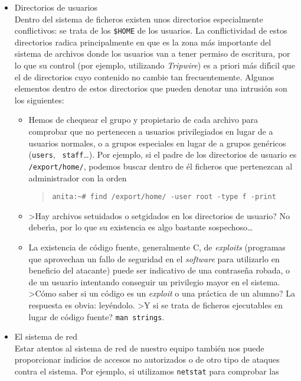 \begin{itemize}
{\it Tripwire}, comentado en este mismo punto.
\item Directorios de usuarios\label{userdir}\\
Dentro del sistema de ficheros existen unos directorios especialmente 
conflictivos: se trata de los {\tt \$HOME} de los usuarios. La conflictividad
de estos directorios radica principalmente en que es la zona m\'as importante 
del sistema de archivos donde los usuarios van a tener permiso de escritura,
por lo que su control (por ejemplo, utilizando {\it Tripwire}) es a priori 
m\'as dif\'{\i}cil que el de directorios cuyo contenido no cambie tan 
frecuentemente. Algunos elementos dentro de estos directorios que pueden 
denotar una intrusi\'on son los siguientes:
\begin{itemize}
\item Hemos de chequear el grupo y propietario de cada archivo para comprobar
que no pertenecen a usuarios privilegiados en lugar de a usuarios normales, o a 
grupos especiales en lugar de a grupos gen\'ericos ({\tt users}, {\tt 
staff}\ldots).  Por ejemplo, si el padre de los directorios de usuario es {\tt 
/export/home/}, podemos buscar dentro de \'el ficheros que pertenezcan al 
administrador con la orden
\tt
\begin{quote}
\begin{verbatim}
anita:~# find /export/home/ -user root -type f -print
\end{verbatim}
\end{quote}
\rm
\item >Hay archivos setuidados o setgidados en los directorios de usuario? No
deber\'{\i}a, por lo que su existencia es algo bastante sospechoso\ldots
\item La existencia de c\'odigo fuente, generalmente C, de {\it exploits}
(programas que aprovechan un fallo de seguridad en el {\it software} para
utilizarlo en beneficio del atacante) puede ser
indicativo de una contrase\~na robada, o de un usuario intentando conseguir
un privilegio mayor en el sistema. >C\'omo saber si un c\'odigo es un {\it
exploit} o una pr\'actica de un alumno? La respuesta es obvia: ley\'endolo.
>Y si se trata de ficheros ejecutables en lugar de c\'odigo fuente? {\tt man
strings}.
\end{itemize}
\item El sistema de red\\
Estar atentos al sistema de red de nuestro equipo tambi\'en nos puede 
proporcionar indicios de accesos no autorizados o de otro tipo de ataques contra
el sistema. Por ejemplo, si utilizamos {\tt netstat} para comprobar las 

\end{itemize}
